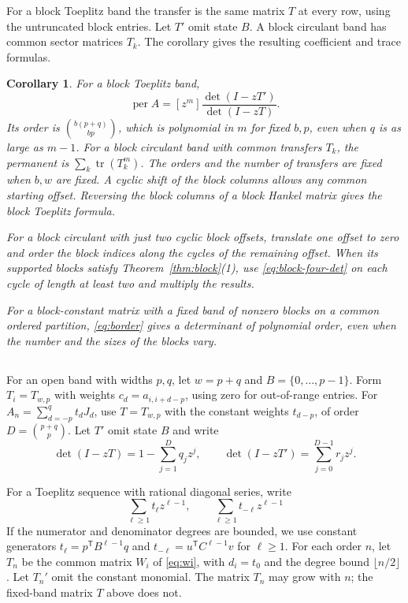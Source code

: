 \documentclass[11pt,reqno]{amsart}
\newtheorem{corollary}[theorem]{Corollary}
\theoremstyle{remark}
\numberwithin{equation}{section}
\newcommand{\per}{\operatorname{per}}
\newcommand{\tr}{\operatorname{tr}}
\begin{document}
For a block Toeplitz band the transfer is the same matrix
\(T\) at every row, using the untruncated block entries.
Let \(T'\) omit state \(B\). A block circulant band has common
sector matrices \(T_k\). The corollary gives the resulting
coefficient and trace formulas.

\begin{corollary}\label{cor:block}
For a block Toeplitz band,
\begin{equation}\label{eq:block-toeplitz}
 \per A=[z^m]\frac{\det(I-zT')}{\det(I-zT)}.
\end{equation}
Its order is \(\binom{b(p+q)}{bp}\), which is polynomial in \(m\)
for fixed \(b,p\), even when \(q\) is as large as \(m-1\). For a block
circulant band with common transfers \(T_k\), the permanent is
\(\sum_k\tr(T_k^m)\). The orders and the number of transfers are
fixed when \(b,w\) are fixed. A cyclic shift of the block columns
allows any common starting offset. Reversing the block columns
of a block Hankel matrix gives the block Toeplitz formula.

For a block circulant with just two cyclic block offsets,
translate one offset to zero and order the block indices along
the cycles of the remaining offset. When its supported blocks
satisfy Theorem~\ref{thm:block}(1), use \eqref{eq:block-four-det}
on each cycle of length at least two and multiply the results.

For a block-constant matrix with a fixed band of nonzero blocks
on a common ordered partition, \eqref{eq:border} gives a
determinant of polynomial order, even when the number and the
sizes of the blocks vary.
\end{corollary}

\subsection{}

For an open band with widths \(p,q\), let \(w=p+q\) and
\(B=\{0,\ldots,p-1\}\). Form \(T_i=T_{w,p}\) with weights
\(c_d=a_{i,i+d-p}\), using zero for out-of-range entries.
For \(A_n=\sum_{d=-p}^q t_dJ_d\), use \(T=T_{w,p}\) with the
constant weights \(t_{d-p}\), of order \(D=\binom{p+q}{p}\).
Let \(T'\) omit state \(B\) and write
\[
 \det(I-zT)=1-\sum_{j=1}^Dq_jz^j,\qquad
 \det(I-zT')=\sum_{j=0}^{D-1}r_jz^j .
\]

For a Toeplitz sequence with rational diagonal series, write
\begin{equation}\label{eq:toeplitz-rational}
 \sum_{\ell\ge1}t_\ell z^{\ell-1},\qquad
 \sum_{\ell\ge1}t_{-\ell}z^{\ell-1}
\end{equation}
If the numerator and denominator degrees are bounded, we use
constant generators \(t_\ell=p^{\mathsf T}B^{\ell-1}q\) and
\(t_{-\ell}=u^{\mathsf T}C^{\ell-1}v\) for \(\ell\ge1\).
For each order \(n\), let \(T_n\) be the common matrix \(W_i\)
of \eqref{eq:wi}, with \(d_i=t_0\) and the degree bound
\(\lfloor n/2\rfloor\). Let \(T_n'\) omit the constant
monomial. The matrix \(T_n\) may grow with \(n\); the fixed-band
matrix \(T\) above does not.
\end{document}
